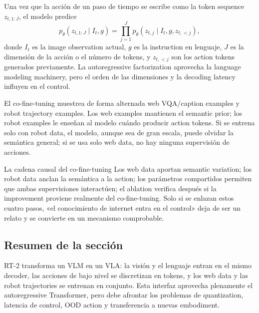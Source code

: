 Una vez que la acción de un paso de tiempo se escribe como la token sequence $z_{t,1:J}$, el modelo predice
$$
p_\theta(z_{t,1:J}\mid I_t,g)
=\prod_{j=1}^{J}p_\theta(z_{t,j}\mid I_t,g,z_{t,<j}),
$$
donde $I_t$ es la image observation actual, $g$ es la instruction en lenguaje, $J$ es la dimensión de la acción o el número de tokens, y $z_{t,<j}$ son los action tokens generados previamente. La autoregressive factorization aprovecha la language modeling machinery, pero el orden de las dimensiones y la decoding latency influyen en el control.

El co-fine-tuning muestrea de forma alternada web VQA/caption examples y robot trajectory examples. Los web examples mantienen el semantic prior; los robot examples le enseñan al modelo cuándo producir action tokens. Si se entrena solo con robot data, el modelo, aunque sea de gran escala, puede olvidar la semántica general; si se usa solo web data, no hay ninguna supervisión de acciones.




\begin{importantbox}{La cadena causal del co-fine-tuning}
Los web data aportan semantic variation; los robot data anclan la semántica a la action; los parámetros compartidos permiten que ambas supervisiones interactúen; el ablation verifica después si la improvement proviene realmente del co-fine-tuning. Solo si se enlazan estos cuatro pasos, «el conocimiento de internet entra en el control» deja de ser un relato y se convierte en un mecanismo comprobable.
\end{importantbox}

\subsection{Resumen de la sección}

RT-2 transforma un VLM en un VLA: la visión y el lenguaje entran en el mismo decoder, las acciones de bajo nivel se discretizan en tokens, y los web data y las robot trajectories se entrenan en conjunto. Esta interfaz aprovecha plenamente el autoregressive Transformer, pero debe afrontar los problemas de quantization, latencia de control, OOD action y transferencia a nuevas embodiment.
